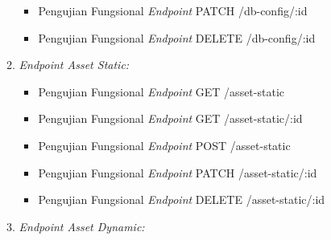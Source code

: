 \begin{enumerate}[label*=\arabic*.,ref=\arabic*]
\begin{enumerate}[label=\alph*.]
\begin{itemize}
                \item Pengujian Fungsional \textit{Endpoint} PATCH /db-config/:id
                \vspace{-0.5em}
                
                
                \item Pengujian Fungsional \textit{Endpoint} DELETE /db-config/:id
                \vspace{-0.5em}
                
                
        \end{itemize}
    
        \item \textit{Endpoint Asset Static:} 
            \begin{itemize}
            
                \item Pengujian Fungsional \textit{Endpoint} GET /asset-static
                \vspace{-0.5em}
                
                
                \item Pengujian Fungsional \textit{Endpoint} GET /asset-static/:id
                \vspace{-0.5em}
                
                
                \item Pengujian Fungsional \textit{Endpoint} POST /asset-static
                \vspace{-0.5em}
                
                
                \item Pengujian Fungsional \textit{Endpoint} PATCH /asset-static/:id
                \vspace{-0.5em}
                
                
                \item Pengujian Fungsional \textit{Endpoint} DELETE /asset-static/:id
                \vspace{-0.5em}
                
                
            \end{itemize}
    
        \item \textit{Endpoint Asset Dynamic:} 
            \begin{itemize}
            

\end{itemize}
\end{enumerate}
\end{enumerate}
